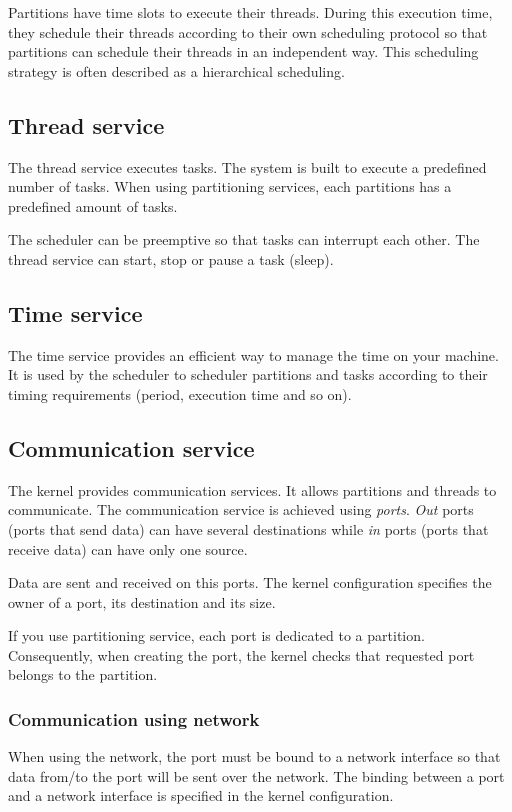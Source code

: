    Partitions have time slots to execute their threads. During this execution
   time, they schedule their threads according to their own scheduling protocol
   so that partitions can schedule their threads in an independent way. This
   scheduling strategy is often described as a hierarchical scheduling.

   \subsection{Thread service}
   The thread service executes tasks. The system is built to execute a
   predefined number of tasks. When using partitioning services, each partitions
   has a predefined amount of tasks.

   The scheduler can be preemptive so that tasks can interrupt each other. The
   thread service can start, stop or pause a task (sleep).

   \subsection{Time service}
   The time service provides an efficient way to manage the time on your
   machine. It is used by the scheduler to scheduler partitions and tasks
   according to their timing requirements (period, execution time and so on).

   \subsection{Communication service}
   \label{kernel-service-communication}
   The kernel provides communication services. It allows partitions and threads
   to communicate. The communication service is achieved using \textit{ports}.
   \textit{Out} ports (ports that send data) can have several destinations 
   while \textit{in} ports (ports that receive data) can have only one source. 

   Data are sent and received on this ports. The kernel configuration specifies
   the owner of a port, its destination and its size.

   If you use partitioning service, each port is dedicated to a partition.
   Consequently, when creating the port, the kernel checks that requested port
   belongs to the partition.

      \subsubsection{Communication using network}
      When using the network, the port must be bound to a network interface so
      that data from/to the port will be sent over the network. The binding
      between a port and a network interface is specified in the kernel
      configuration.

